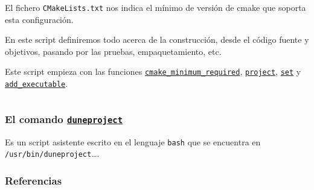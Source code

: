 





\begin{frame}[fragile]
	El fichero \lstinline{CMakeLists.txt} nos indica el mínimo de
	versión de cmake que soporta esta configuración.

	En este script definiremos todo acerca de la construcción, desde el
	código fuente y objetivos, pasando por las pruebas,
	empaquetamiento, etc.

	Este script empieza con las funciones
	\href{https://cmake.org/cmake/help/latest/command/cmake_minimum_required.html}{\lstinline{cmake_minimum_required}},
	\href{https://cmake.org/cmake/help/latest/command/project.html}{\lstinline{project}},
	\href{https://cmake.org/cmake/help/latest/command/set.html}{\lstinline{set}} y
	\href{https://cmake.org/cmake/help/latest/command/add_executable.html}{\lstinline{add_executable}}.
\end{frame}

\begin{frame}[fragile]

	\inputminted{cmake}{CMakeList.txt.sample}

\end{frame}

\begin{frame}
	\frametitle{El comando \href{https://gitlab.dune-project.org/core/dune-common/-/raw/master/bin/duneproject}{\lstinline{duneproject}}}

	Es un script asistente escrito en el lenguaje \lstinline{bash} que se encuentra en \lstinline{/usr/bin/duneproject}\ldots.

\end{frame}

\begin{frame}\transblindsvertical
	\frametitle{Referencias}
\end{frame}


